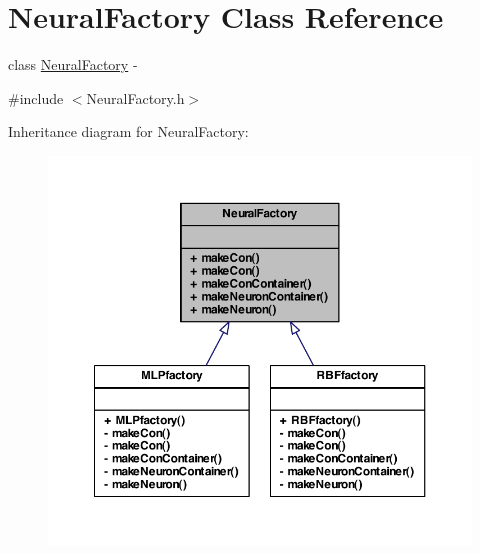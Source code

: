 \hypertarget{class_neural_factory}{
\section{NeuralFactory Class Reference}
\label{class_neural_factory}
}


class \hyperlink{class_neural_factory}{NeuralFactory} -\/  




{\ttfamily \#include $<$NeuralFactory.h$>$}



Inheritance diagram for NeuralFactory:
\nopagebreak
\begin{figure}[H]
\begin{center}
\leavevmode
\includegraphics[width=362pt]{class_neural_factory__inherit__graph}
\end{center}
\end{figure}
